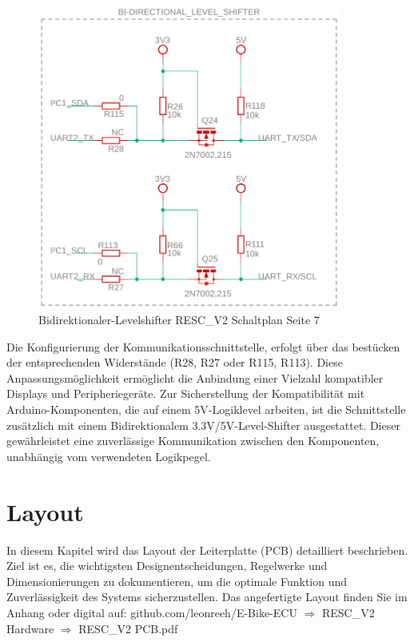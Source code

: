 \documentclass[paper=a4,11pt]{scrreprt}
\begin{document}
\begin{figure}[ht]
\begin{center}
\includegraphics[width=10cm]{Bilder/shifter.PNG}
\caption{Bidirektionaler-Levelshifter RESC\_V2 Schaltplan Seite 7}
\label{shifter}
\end{center}
\end{figure}

Die Konfigurierung der Kommunikationsschnittstelle, erfolgt über das bestücken der entsprechenden Widerstände (R28, R27 oder R115, R113). Diese Anpassungsmöglichkeit ermöglicht die Anbindung einer Vielzahl kompatibler Displays und Peripheriegeräte. Zur Sicherstellung der Kompatibilität mit Arduino-Komponenten, die auf einem 5V-Logiklevel arbeiten, ist die Schnittstelle zusätzlich mit einem Bidirektionalem 3.3V/5V-Level-Shifter ausgestattet. Dieser gewährleistet eine zuverlässige Kommunikation zwischen den Komponenten, unabhängig vom verwendeten Logikpegel.

\chapter{Layout}
In diesem Kapitel wird das Layout der Leiterplatte (PCB) detailliert beschrieben. Ziel ist es, die wichtigsten Designentscheidungen, Regelwerke und Dimensionierungen zu dokumentieren, um die optimale Funktion und Zuverlässigkeit des Systems sicherzustellen. Das angefertigte Layout finden Sie im Anhang oder digital auf: 
github.com/leonreeh/E-Bike-ECU $\Rightarrow$ RESC\_V2 Hardware $\Rightarrow$ RESC\_V2 PCB.pdf
\end{document}
